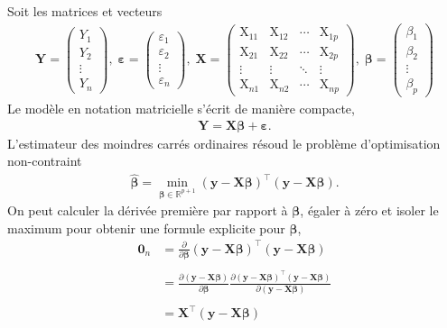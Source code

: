 \documentclass[
  11pt,
  letterpaper,
]{article}
\theoremstyle{definition}
\theoremstyle{definition}
\theoremstyle{definition}
\theoremstyle{remark}
\begin{document}
Soit les matrices et vecteurs
\begin{align*}
\boldsymbol{Y} =
 \begin{pmatrix}
  Y_1 \\
  Y_2 \\
  \vdots \\
  Y_n 
 \end{pmatrix} ,
 \;
 \boldsymbol{\varepsilon} =
 \begin{pmatrix}
  \varepsilon_1 \\
  \varepsilon_2 \\
  \vdots \\
  \varepsilon_n 
 \end{pmatrix} ,
 \;
\mathbf{X} = \begin{pmatrix}
\mathrm{X}_{11} & \mathrm{X}_{12} & \cdots & \mathrm{X}_{1p} \\
\mathrm{X}_{21} & \mathrm{X}_{22} & \cdots & \mathrm{X}_{2p} \\
\vdots & \vdots & \ddots & \vdots \\
\mathrm{X}_{n1} & \mathrm{X}_{n2} & \cdots & \mathrm{X}_{np} 
\end{pmatrix} , \;
\boldsymbol{\beta} =
 \begin{pmatrix}
  \beta_1 \\
  \beta_2 \\
  \vdots \\
  \beta_p 
 \end{pmatrix}
\end{align*}
Le modèle en notation matricielle s'écrit de manière compacte, \begin{align*}
\boldsymbol{Y} = \mathbf{X} \boldsymbol{\beta} + \boldsymbol{\varepsilon}.
\end{align*}
L'estimateur des moindres carrés ordinaires résoud le problème d'optimisation non-contraint
\begin{align*}
\widehat{\boldsymbol{\beta}}=\min_{\boldsymbol{\beta} \in \mathbb{R}^{p+1}}(\boldsymbol{y}-\mathbf{X}\boldsymbol{\beta})^\top(\boldsymbol{y}-\mathbf{X}\boldsymbol{\beta}).
\end{align*}
On peut calculer la dérivée première par rapport à \(\boldsymbol{\beta}\), égaler à zéro et isoler le maximum pour obtenir une formule explicite pour \(\widehat{\boldsymbol{\beta}}\),\\
\begin{align*}
\mathbf{0}_n&=\frac{\partial}{\partial\boldsymbol{\beta}}(\boldsymbol{y}-\mathbf{X}\boldsymbol{\beta})^\top(\boldsymbol{y}-\mathbf{X}\boldsymbol{\beta})\\
\\&=\frac{\partial (\boldsymbol{y}-\mathbf{X}\boldsymbol{\beta})}{\partial \boldsymbol{\beta}}\frac{\partial (\boldsymbol{y}-\mathbf{X}\boldsymbol{\beta})^\top(\boldsymbol{y}-\mathbf{X}\boldsymbol{\beta})}{\partial (\boldsymbol{y}-\mathbf{X}\boldsymbol{\beta})}\\
 \\&=\mathbf{X}^\top (\boldsymbol{y}-\mathbf{X}\boldsymbol{\beta})
\end{align*}
\end{document}
